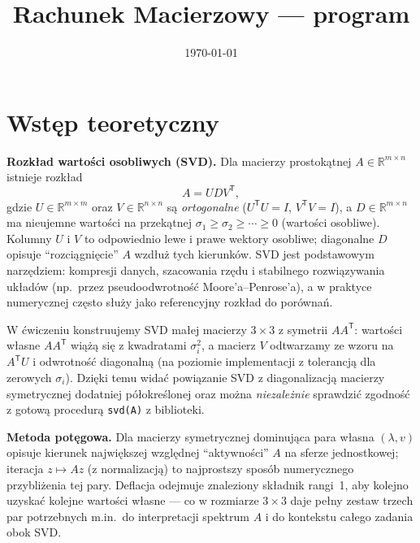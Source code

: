 \documentclass[polish]{template/projectreport}
\title{\TytulZadania\\{\large Rachunek Macierzowy --- program \NumerProgramu}}
\author{\Autorzy}
\date{\today}
\begin{document}
\maketitle


\section{Wstęp teoretyczny}
\textbf{Rozkład wartości osobliwych (SVD).} Dla macierzy prostokątnej $A\in\mathbb{R}^{m\times n}$ istnieje rozkład
\[
  A = U D V^{\mathsf{T}},
\]
gdzie $U\in\mathbb{R}^{m\times m}$ oraz $V\in\mathbb{R}^{n\times n}$ są \emph{ortogonalne} ($U^{\mathsf{T}}U=I$,
$V^{\mathsf{T}}V=I$), a $D\in\mathbb{R}^{m\times n}$ ma nieujemne wartości na przekątnej
$\sigma_1\ge\sigma_2\ge\cdots\ge 0$ (wartości osobliwe). Kolumny $U$ i $V$ to odpowiednio lewe i prawe wektory osobliwe;
diagonalne $D$ opisuje ``rozciągnięcie'' $A$ wzdłuż tych kierunków. SVD jest podstawowym narzędziem: kompresji danych,
szacowania rzędu i stabilnego rozwiązywania układów (np.\ przez pseudoodwrotność Moore'a--Penrose'a), a w praktyce
numerycznej często służy jako referencyjny rozkład do porównań.

W ćwiczeniu konstruujemy SVD małej macierzy $3\times 3$ z symetrii $AA^{\mathsf{T}}$: wartości własne $AA^{\mathsf{T}}$
wiążą się z kwadratami $\sigma_i^2$, a macierz $V$ odtwarzamy ze wzoru na $A^{\mathsf{T}}U$ i odwrotność diagonalną
(na poziomie implementacji z tolerancją dla zerowych $\sigma_i$). Dzięki temu widać powiązanie SVD z diagonalizacją
macierzy symetrycznej dodatniej półokreślonej oraz można \emph{niezależnie} sprawdzić zgodność z gotową procedurą
\texttt{svd(A)} z biblioteki.

\textbf{Metoda potęgowa.} Dla macierzy symetrycznej dominująca para własna $(\lambda,v)$ opisuje kierunek największej
względnej ``aktywności'' $A$ na sferze jednostkowej; iteracja $z\mapsto Az$ (z normalizacją) to najprostszy sposób
numerycznego przybliżenia tej pary. Deflacja odejmuje znaleziony składnik rangi~1, aby kolejno uzyskać kolejne wartości
własne --- co w rozmiarze $3\times 3$ daje pełny zestaw trzech par potrzebnych m.in.\ do interpretacji spektrum $A$
i do kontekstu całego zadania obok SVD.
\end{document}

